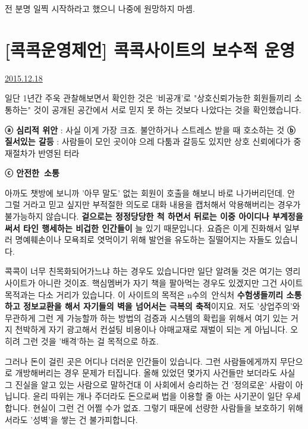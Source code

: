 전 분명 일찍 시작하라고 했으니 나중에 원망하지 마셈.
\vspace{5mm}







\section{[콕콕운영제언] 콕콕사이트의 보수적 운영}
\href{https://www.kockoc.com/Apoc/552129}{2015.12.18}

\vspace{5mm}

일단 1년간 주욱 관찰해보면서 확인한 것은
'비공개'로 "상호신뢰가능한 회원들끼리 소통하는" 것이
공개된 공간에서 서로 믿지 못 하는 것보다 나았다는 것을 확인했습니다.
\vspace{5mm}

\textbf{ⓐ 심리적 위안} : 사실 이게 가장 크죠. 불안하거나 스트레스 받을 때 호소하는 것
\textbf{ⓑ 질서있는 갈등} : 사람들이 모인 곳이야 으레 다툼과 갈등도 있지만 상호 신뢰에다가 중재절차가 반영된 터라
\vspace{5mm}

\textbf{ⓒ 안전한 소통}
\vspace{5mm}

아까도 챗방에 보니까 '아무 말도' 없는 회원이 호출을 해보니 바로 나가버리던데.
안 그럴 거라고 믿고 싶지만 부적절한 의도로 대화 내용을 캡처해서 악용해버리는 경우가 불가능하지 않습니다.
\textbf{겉으로는 정정당당한 척 하면서 뒤로는 이중 아이디나 부계정을 써서 타인 행세하는 비겁한 인간들이} 늘 있기 때문입니다.
요즘은 이게 진화해서 일부러 명예훼손이나 모욕죄로 엿먹이기 위해 발언을 유도하는 질떨어지는 자들도 있습니다.
\vspace{5mm}

콕콕이 너무 친목화되어가느냐 하는 경우도 있습니다만 일단 알려둘 것은
여기는 영리 사이트가 아니란 것이죠. 핵심멤버가 자기 책을 팔아먹는 경우도 있겠지만 그건 사이트 목적과는 다소 거리가 있습니다.
이 사이트의 목적은 n수의 안식처 \textbf{수험생들끼리 소통하고 정보교환을 해서 자기들의 벽을 넘어서는 극복의 축적}이지요.
저도 '상업주의'와 무관하게 그런 게 가능할까 하는 방법의 검증과 시스템의 확립을 위해서 여기 있는 거지
천박하게 자기 광고해서 컨설팅 비용이나 야매교재로 재벌이 되는 게 아닙니다. 오히려 그런 것을 '배격'하는 걸 목적으로 하죠.
\vspace{5mm}

그러나 돈이 걸린 곳은 어디나 더러운 인간들이 있습니다.
그런 사람들에게까지 무단으로 개방해버리는 경우 문제가 터집니다.
올해 있었던 몇가지 사건들만 보더라도 사실 그 진실을 알고 있는 사람으로 말하건대 이 사회에서 승리하는 건 '정의로운' 사람이 아닙니다.
윤리 따위는 개나 주더라도 돈으로써 법을 이용할 줄 아는 사기꾼이 일단 우세합니다. 현실이 그런 건 어쩔 수가 없죠.
그렇기 때문에 선량한 사람들을 보호하기 위해서라도 '성벽'을 쌓는 건 불가피합니다.
\vspace{5mm}

